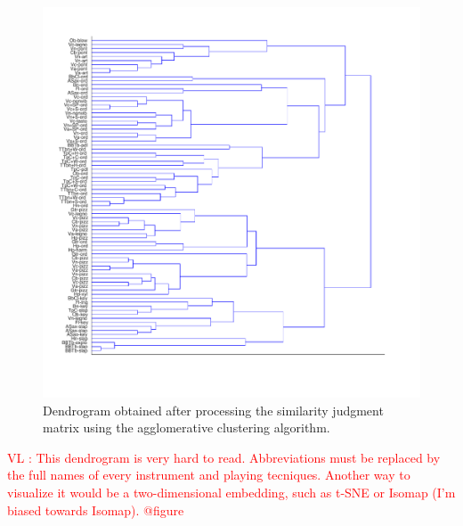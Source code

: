 \documentclass{article}
\newcommand{\vl}[1]{\textcolor{red}{VL : #1}}
\begin{document}
\begin{figure}
\center
\includegraphics[width = \textwidth]{figures/dendrogram.pdf}
\caption{Dendrogram obtained after processing the similarity judgment matrix using the agglomerative clustering algorithm.}
\label{fig:dendrogram}
\end{figure}

\vl{This dendrogram is very hard to read. Abbreviations must be replaced by the full names of every instrument and playing tecniques.
Another way to visualize it would be a two-dimensional embedding, such as t-SNE or Isomap (I'm biased towards Isomap). @figure
}
\end{document}
